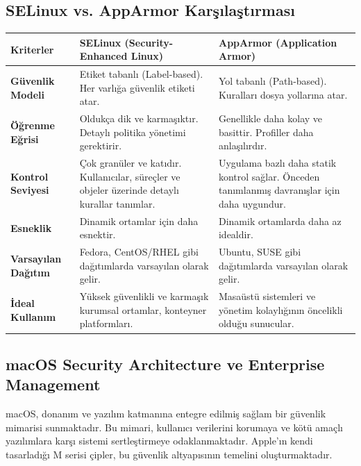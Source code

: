 \subsection{SELinux vs. AppArmor Karşılaştırması}

\begin{longtable}{|p{4.5cm}|p{4.5cm}|p{4.5cm}|}

\hline

\textbf{Kriterler} & \textbf{SELinux (Security-Enhanced Linux)} & \textbf{AppArmor (Application Armor)} \\
\hline
\textbf{Güvenlik Modeli} & Etiket tabanlı (Label-based). Her varlığa güvenlik etiketi atar. & Yol tabanlı (Path-based). Kuralları dosya yollarına atar. \\
\hline
\textbf{Öğrenme Eğrisi} & Oldukça dik ve karmaşıktır. Detaylı politika yönetimi gerektirir. & Genellikle daha kolay ve basittir. Profiller daha anlaşılırdır. \\
\hline
\textbf{Kontrol Seviyesi} & Çok granüler ve katıdır. Kullanıcılar, süreçler ve objeler üzerinde detaylı kurallar tanımlar. & Uygulama bazlı daha statik kontrol sağlar. Önceden tanımlanmış davranışlar için daha uygundur. \\
\hline
\textbf{Esneklik} & Dinamik ortamlar için daha esnektir. & Dinamik ortamlarda daha az idealdir. \\
\hline
\textbf{Varsayılan Dağıtım} & Fedora, CentOS/RHEL gibi dağıtımlarda varsayılan olarak gelir. & Ubuntu, SUSE gibi dağıtımlarda varsayılan olarak gelir. \\
\hline
\textbf{İdeal Kullanım} & Yüksek güvenlikli ve karmaşık kurumsal ortamlar, konteyner platformları. & Masaüstü sistemleri ve yönetim kolaylığının öncelikli olduğu sunucular. \\
\hline
\end{longtable}

\subsection{macOS Security Architecture ve Enterprise Management}

macOS, donanım ve yazılım katmanına entegre edilmiş sağlam bir güvenlik mimarisi sunmaktadır. Bu mimari, kullanıcı verilerini korumaya ve kötü amaçlı yazılımlara karşı sistemi sertleştirmeye odaklanmaktadır. Apple'ın kendi tasarladığı M serisi çipler, bu güvenlik altyapısının temelini oluşturmaktadır.

